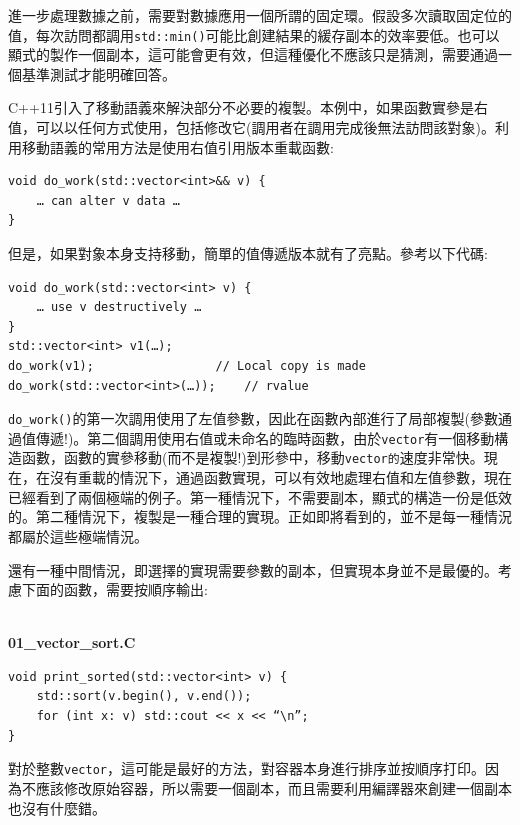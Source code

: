 進一步處理數據之前，需要對數據應用一個所謂的固定環。假設多次讀取固定位的值，每次訪問都調用\texttt{std::min()}可能比創建結果的緩存副本的效率要低。也可以顯式的製作一個副本，這可能會更有效，但這種優化不應該只是猜測，需要通過一個基準測試才能明確回答。

C++11引入了移動語義來解決部分不必要的複製。本例中，如果函數實參是右值，可以以任何方式使用，包括修改它(調用者在調用完成後無法訪問該對象)。利用移動語義的常用方法是使用右值引用版本重載函數:

\begin{lstlisting}[style=styleCXX]
void do_work(std::vector<int>&& v) {
	… can alter v data … 
}
\end{lstlisting}

但是，如果對象本身支持移動，簡單的值傳遞版本就有了亮點。參考以下代碼:

\begin{lstlisting}[style=styleCXX]
void do_work(std::vector<int> v) {
	… use v destructively … 
}
std::vector<int> v1(…);
do_work(v1);                 // Local copy is made
do_work(std::vector<int>(…));    // rvalue
\end{lstlisting}

\texttt{do\_work()}的第一次調用使用了左值參數，因此在函數內部進行了局部複製(參數通過值傳遞!)。第二個調用使用右值或未命名的臨時函數，由於\texttt{vector}有一個移動構造函數，函數的實參移動(而不是複製!)到形參中，移動\texttt{vector的}速度非常快。現在，在沒有重載的情況下，通過函數實現，可以有效地處理右值和左值參數，現在已經看到了兩個極端的例子。第一種情況下，不需要副本，顯式的構造一份是低效的。第二種情況下，複製是一種合理的實現。正如即將看到的，並不是每一種情況都屬於這些極端情況。


還有一種中間情況，即選擇的實現需要參數的副本，但實現本身並不是最優的。考慮下面的函數，需要按順序輸出:

\hspace*{\fill} \\ %
\noindent
\textbf{01\_vector\_sort.C}
\begin{lstlisting}[style=styleCXX]
void print_sorted(std::vector<int> v) {
	std::sort(v.begin(), v.end());
	for (int x: v) std::cout << x << “\n”;
}
\end{lstlisting}

對於整數\texttt{vector}，這可能是最好的方法，對容器本身進行排序並按順序打印。因為不應該修改原始容器，所以需要一個副本，而且需要利用編譯器來創建一個副本也沒有什麼錯。

